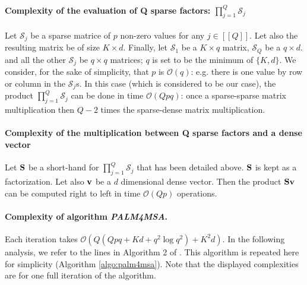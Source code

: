 \paragraph{Complexity of the evaluation of Q sparse factors: $\prod_{j=1}^{Q}\mathcal{S}_j$}
Let $\mathcal{S}_j$ be a sparse matrice of $p$ non-zero values for any $j \in [\![Q]\!]$. Let also the resulting matrix be of size $K \times d$.  Finally, let $\mathcal{S}_1$ be a $K \times q$ matrix, $\mathcal{S}_Q$ be a $q \times d$. and all the other $\mathcal{S}_j$ be $q \times q$ matrices; $q$ is set to be the minimum of $\{K, d\}$. We consider, for the sake of simplicity, that $p$ is $\mathcal{O}(q)$: e.g. there is one value by row or column in the $\mathcal{S}_j$s. In this case (which is considered to be our case), the product $\prod_{j=1}^{Q}\mathcal{S}_j$ can be done in time $\mathcal{O}(Qpq)$: once a sparse-sparse matrix multiplication then $Q-2$ times the sparse-dense matrix multiplication.

\paragraph{Complexity of the multiplication between Q sparse factors and a dense vector}
Let ${\mathbf{S}}$ be a short-hand for $\prod_{j=1}^{Q}\mathcal{S}_j$ that has been detailed above. ${\mathbf{S}}$ is kept as a factorization. Let also ${\mathbf{v}}$ be a $d$ dimensional dense vector. Then the product ${\mathbf{S}} {\mathbf{v}}$ can be computed right to left in time $\mathcal{O}(Qp)$ operations.

\paragraph{Complexity of algorithm \textit{PALM4MSA}.}
Each iteration takes $\mathcal{O}(Q(Qpq + Kd + q^2\log q^2) + K^2d)$. In the following analysis, we refer to the lines in Algorithm 2 of \cite{magoarou2014learning}. This algorithm is repeated here for simplicity (Algorithm \ref{algo:palm4msa}). Note that the displayed complexities are for one full iteration of the algorithm.

